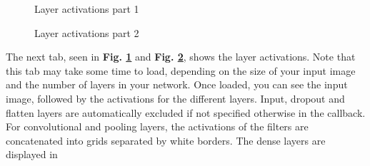 
\begin{figure}[h!]
    \centering
        \caption{Layer activations part 1}
        \label{layeract-tab1}
\end{figure}

\begin{figure}[h!]
    \centering
        \caption{Layer activations part 2}
        \label{layeract-tab2}
\end{figure}

\noindent The next tab, seen in \textbf{Fig. \ref{layeract-tab1}} and \textbf{Fig. \ref{layeract-tab2}}, shows the layer activations. Note that this tab may take some time to load, depending on the size of your input image and the number of layers in your network. Once loaded, you can see the input image, followed by the activations for the different layers. Input, dropout and flatten layers are automatically excluded if not specified otherwise in the callback.  For convolutional and pooling layers, the activations of the filters are concatenated into grids separated by white borders. The dense layers are displayed in  \\%

